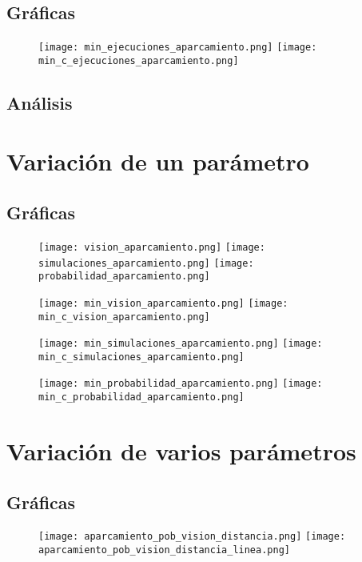 \subsection{Gráficas}

\begin{figure}[h]
\texttt{[image: min\_ejecuciones\_aparcamiento.png]}
\texttt{[image: min\_c\_ejecuciones\_aparcamiento.png]}
\centering
\end{figure}


\subsection{Análisis}

\section{Variación de un parámetro}
\subsection{Gráficas}

\begin{figure}[h]
\texttt{[image: vision\_aparcamiento.png]}
\texttt{[image: simulaciones\_aparcamiento.png]}
\texttt{[image: probabilidad\_aparcamiento.png]}
\centering
\end{figure}


\begin{figure}[h]
\texttt{[image: min\_vision\_aparcamiento.png]}
\texttt{[image: min\_c\_vision\_aparcamiento.png]}
\centering
\end{figure}
\begin{figure}[h]
\texttt{[image: min\_simulaciones\_aparcamiento.png]}
\texttt{[image: min\_c\_simulaciones\_aparcamiento.png]}
\centering
\end{figure}
\begin{figure}[h]
\texttt{[image: min\_probabilidad\_aparcamiento.png]}
\texttt{[image: min\_c\_probabilidad\_aparcamiento.png]}
\centering
\end{figure}

\section{Variación de varios parámetros}
\subsection{Gráficas}
\begin{figure}[h]
\texttt{[image: aparcamiento\_pob\_vision\_distancia.png]}
\texttt{[image: aparcamiento\_pob\_vision\_distancia\_linea.png]}
\centering
\end{figure}
